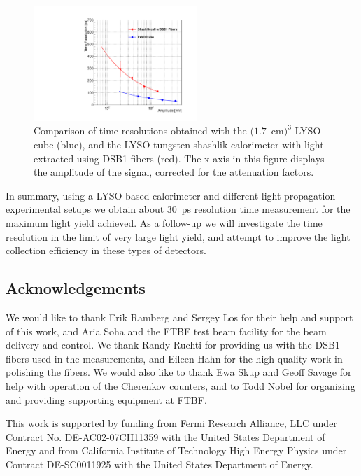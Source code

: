 \begin{figure}[ht!] \centering
\includegraphics[width=0.55\textwidth]{figs/TimeResolutionVsEnergy_ShashlikDSB1FiberAndCube} 
\caption{\small Comparison of time resolutions obtained with the $(1.7$~cm$)^{3}$ LYSO cube (blue), 
and the LYSO-tungsten shashlik calorimeter with light extracted using DSB1 fibers (red). 
 The x-axis in this figure displays the amplitude of the
signal, corrected for the attenuation factors. }
\label{fig:ShashlikFiberAndCubeTOF}
\end{figure}

In summary, using a LYSO-based calorimeter and different light propagation experimental setups 
we obtain about $30$~ps resolution time measurement for the maximum light yield achieved. 
As a follow-up we will investigate the time resolution in the limit of very large light yield, 
and attempt to improve the light collection efficiency in these types of detectors.

\subsection{Acknowledgements} We would like to thank Erik Ramberg and Sergey Los for their help and support of this work, and Aria Soha and the FTBF test beam facility for
the beam delivery and control. We thank Randy Ruchti for providing us with
the DSB1 fibers used in the measurements, and Eileen Hahn for the high quality
work in polishing the fibers. We would also like to thank Ewa Skup and Geoff Savage for help with
operation of the Cherenkov counters, and to Todd Nobel for organizing and providing
supporting equipment at FTBF.

This work is supported by funding from Fermi Research Alliance, LLC under Contract No. DE-AC02-07CH11359 with the United States Department of Energy and from California Institute of Technology High Energy Physics under Contract DE-SC0011925 with the United States Department of Energy. 

\clearpage
